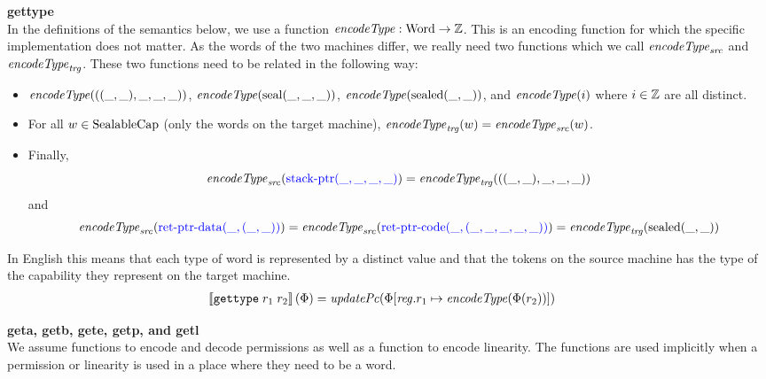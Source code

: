 \documentclass[a4paper]{article}
\begin{document}
\noindent\textbf{gettype}\\
In the definitions of the semantics below, we use a function $\encType{} : \Word \rightarrow \ints$. This is an encoding function for which the specific implementation does not matter. As the words of the two machines differ, we really need two functions which we call $\encType{}_{\var{src}}$ and $\encType{}_{\var{trg}}$. These two functions need to be related in the following way:
\begin{itemize}
\item $\encType{}(((\_,\_),\_,\_,\_))$, $\encType{}(\seal{\_,\_,\_})$, $\encType{}(\sealed{\_,\_})$, and $\encType{}(i)$ where $i\in\mathbb{Z}$ are all distinct.
\item For all $w \in \mathrm{SealableCap}$ (only the words on the target machine), $\encType{}_{\var{trg}}(w) = \encType{}_{\var{src}}(w)$.
\item Finally, 
\[
\encType{}_{\var{src}}(\src{\stkptr{\_,\_,\_,\_}}) = \encType{}_{\var{trg}}(((\_,\_),\_,\_,\_))
\]
 and 
\[
\encType{}_{\var{src}}(\src{\retptrd(\_,(\_,\_))}) = \encType{}_{\var{src}}(\src{\retptrc(\_,(\_,\_,\_,\_,\_))}) = \encType{}_{\var{trg}}(\sealed{\_,\_})
\]
\end{itemize}
In English this means that each type of word is represented by a distinct value and that the tokens on the source machine has the type of the capability they represent on the target machine.
\begin{align*}
  \sem{\tisptr{r_1}{r_2}}(\Phi) = & \; \updPcAddr{}(\Phi\updReg{r_1}{\encType{\Phi(r_2)}})
\end{align*}


\noindent\textbf{geta, getb, gete, getp, and getl}\\
We assume functions to encode and decode permissions as well as a function to encode linearity. The functions are used implicitly when a permission or linearity is used in a place where they need to be a word.
\end{document}
